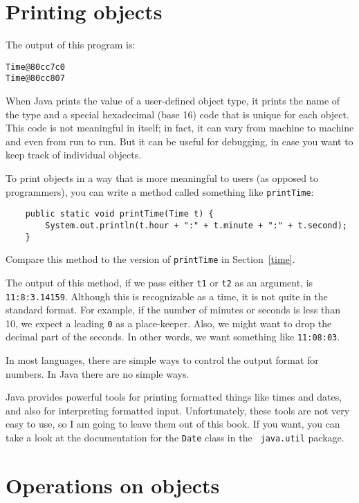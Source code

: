 \documentclass[12pt]{book}
\theoremstyle{definition}
\begin{document}
\section{Printing objects}
\label{printobject}

The output of this program is:

\begin{lstlisting}
Time@80cc7c0
Time@80cc807
\end{lstlisting}
%
When Java prints the value of a user-defined object type, it prints
the name of the type and a special hexadecimal (base 16) code that is
unique for each object.  This code is not meaningful in itself; in
fact, it can vary from machine to machine and even from run to run.
But it can be useful for debugging, in case you want to keep track of
individual objects.

To print objects in a way that is more meaningful to users
(as opposed to programmers), you can write a method
called something like {\tt printTime}:

\begin{lstlisting}
    public static void printTime(Time t) {
        System.out.println(t.hour + ":" + t.minute + ":" + t.second);
    }
\end{lstlisting}
%
Compare this method to the version of {\tt printTime} in
Section~\ref{time}.

The output of this method, if we pass either {\tt t1} or {\tt t2} as
an argument, is {\tt 11:8:3.14159}.  Although this is recognizable
as a time, it is not quite in the standard format.  For example, if
the number of minutes or seconds is less than 10, we expect a leading
{\tt 0} as a place-keeper.  Also, we might want to drop the decimal
part of the seconds.  In other words, we want something like
{\tt 11:08:03}.

In most languages, there are simple ways to control the output format
for numbers.  In Java there are no simple ways.

Java provides powerful tools for printing formatted things
like times and dates, and also for interpreting formatted input.
Unfortunately, these tools are not very easy to use, so I am going to
leave them out of this book.  If you want, you can take a look
at the documentation for the {\tt Date} class in the {\tt
java.util} package.


\section{Operations on objects}
\label{objectops}
\end{document}
